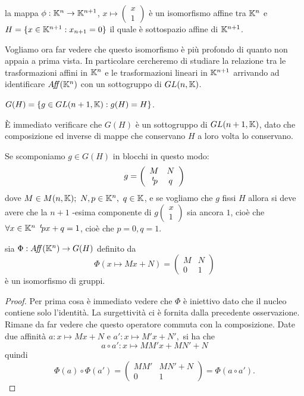  \begin{remark}
 la mappa $\phi:\mathbb K^n\rightarrow \mathbb K^{n+1}$, $x\mapsto
 \left(\begin{smallmatrix}
	x \\
	1
	\end{smallmatrix}\right)$
è un isomorfismo affine tra $\mathbb K^n$ e
$H=\{x\in \mathbb K^{n+1} : x_{n+1}=0\}$ il quale è sottospazio affine di $\mathbb K^{n+1}$.
 \end{remark}
 
 Vogliamo ora far vedere che questo isomorfismo è più profondo di quanto non appaia a prima vista. In particolare cercheremo di studiare
 la relazione tra le trasformazioni affini in $\mathbb K^n$ e le trasformazioni lineari in $\mathbb K^{n+1}$ arrivando ad identificare
 $A\!f\!\!f(\mathbb K^n)$ con un sottogruppo di $GL(n,\mathbb K)$.
 
 \begin{definition}
  $G(H)=\{g\in GL(n+1,\mathbb K):g(H)=H\}$.
 \end{definition}
 
 \begin{remark}
 \`E immediato verificare che  $G(H)$ è un sottogruppo di  $GL(n+1,\mathbb K)$,
 dato che composizione ed inverse di mappe che conservano $H$ a loro volta lo conservano.
 \end{remark}
 
 \begin{remark}
 Se scomponiamo  $g\in G(H)$ in blocchi in questo modo:
 \[
	g = \left(
		\begin{array}{cc}
		M & N \\ 
		\, ^{t}\!p & q
		\end{array}
	\right)
 \]
  dove $M\in M(n,\mathbb K);\  N,p\in \mathbb K^n,\ q \in \mathbb K$, e se vogliamo che  $g$ fissi $H$
 allora si deve avere che la $n+1$ -esima componente di
 $g\left(\begin{smallmatrix}
	x \\
	1
	\end{smallmatrix}
	\right)$
 sia ancora $1$,
 cioè che  $\forall x\in \mathbb K^n\  \, ^{t}\!px+q=1$, cioè che $p=0, q=1$.
 \end{remark}
 
 \begin{proposition}
 sia  $\Phi:A\!f\!\!f(\mathbb K^n)\rightarrow G(H)$ definito da
 \[
	\Phi(x\mapsto Mx+N)=\left(
		\begin{array}{cc}
		M & N \\ 
		0 & 1
		\end{array}
	\right)
 \]
 è un isomorfismo di gruppi.
 \end{proposition}
 
 \begin{proof}
 Per prima cosa è immediato vedere che $\Phi$  è iniettivo dato che il nucleo contiene solo l'identità.
 La surgettività ci è fornita dalla precedente osservazione. Rimane da far vedere che questo operatore commuta con la composizione.
 Date due affinità $a:x\mapsto Mx+N$ e $a':x\mapsto M'x+N',$ si ha che
 \[
	a\circ a':x\mapsto MM'x+ MN'+N
 \]
 quindi
 \[
	\Phi(a)\circ\Phi(a')=\left(
		\begin{array}{cc}
		MM' & MN'+N \\ 
		0 & 1
		\end{array}
	\right)=\Phi(a\circ a').
 \]
 \end{proof}
 